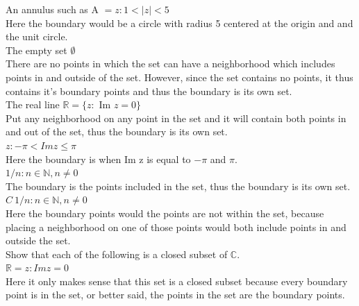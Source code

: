 \documentclass[12pt]{article}
\begin{document}
 An annulus such as A $ = {z: 1 < |z| < 5}$\\

Here the boundary would be a circle with radius 5 centered at the origin and and the unit circle.\\

 The empty set $\emptyset$ \\

There are no points in which the set can have a neighborhood which includes points in and outside of the set.
However, since the set contains no points, it thus contains it's boundary points and thus the boundary is its own set.\\

 The real line $\mathbb{R} = \{z: $ Im $z = 0\}$\\

Put any neighborhood on any point in the set and it will contain both points in and out of the set, thus the boundary is its own set.\\

 ${z: -\pi < Im z \leq \pi}$\\

Here the boundary is when Im z is equal to $-\pi$ and $\pi$.\\

 ${1/n: n \in \mathbb{N}, n \neq 0}$\\

The boundary is the points included in the set, thus the boundary is its own set.\\

 $C \ {1/n: n \in \mathbb{N}, n \neq 0}$\\

Here the boundary points would the points are not within the set, because placing a neighborhood on one of those points would both include points in and outside the set.\\

 Show that each of the following is a closed subset of $\mathbb{C}$.\\

 $\mathbb{R} = {z: Im z = 0}$ \\

Here it only makes sense that this set is a closed subset because every boundary point is in the set, or better said, the points in the set are the boundary points.\\
\end{document}
